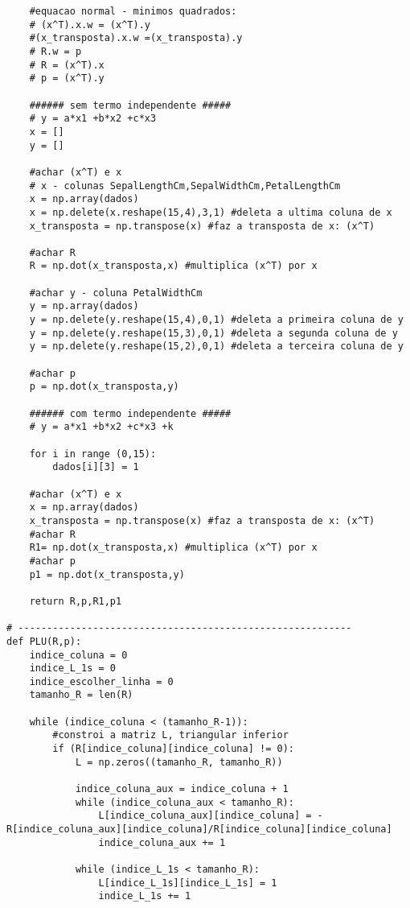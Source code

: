 \documentclass[a4paper,12pt,twoside]{article}
\begin{document}
\begin{lstlisting}
    #equacao normal - minimos quadrados:
    # (x^T).x.w = (x^T).y
    #(x_transposta).x.w =(x_transposta).y
    # R.w = p
    # R = (x^T).x
    # p = (x^T).y
    
    ###### sem termo independente #####
    # y = a*x1 +b*x2 +c*x3
    x = []
    y = []
    
    #achar (x^T) e x
    # x - colunas SepalLengthCm,SepalWidthCm,PetalLengthCm
    x = np.array(dados) 
    x = np.delete(x.reshape(15,4),3,1) #deleta a ultima coluna de x
    x_transposta = np.transpose(x) #faz a transposta de x: (x^T)
       
    #achar R
    R = np.dot(x_transposta,x) #multiplica (x^T) por x
    
    #achar y - coluna PetalWidthCm
    y = np.array(dados) 
    y = np.delete(y.reshape(15,4),0,1) #deleta a primeira coluna de y
    y = np.delete(y.reshape(15,3),0,1) #deleta a segunda coluna de y
    y = np.delete(y.reshape(15,2),0,1) #deleta a terceira coluna de y
    
    #achar p 
    p = np.dot(x_transposta,y) 
  
    ###### com termo independente #####
    # y = a*x1 +b*x2 +c*x3 +k
     
    for i in range (0,15):
        dados[i][3] = 1
        
    #achar (x^T) e x
    x = np.array(dados) 
    x_transposta = np.transpose(x) #faz a transposta de x: (x^T)
    #achar R
    R1= np.dot(x_transposta,x) #multiplica (x^T) por x
    #achar p 
    p1 = np.dot(x_transposta,y) 
      
    return R,p,R1,p1

# ----------------------------------------------------------
def PLU(R,p):
    indice_coluna = 0 
    indice_L_1s = 0
    indice_escolher_linha = 0
    tamanho_R = len(R)
    
    while (indice_coluna < (tamanho_R-1)):
        #constroi a matriz L, triangular inferior
        if (R[indice_coluna][indice_coluna] != 0):
            L = np.zeros((tamanho_R, tamanho_R))
            
            indice_coluna_aux = indice_coluna + 1
            while (indice_coluna_aux < tamanho_R):
                L[indice_coluna_aux][indice_coluna] = - R[indice_coluna_aux][indice_coluna]/R[indice_coluna][indice_coluna]
                indice_coluna_aux += 1
            
            while (indice_L_1s < tamanho_R):
                L[indice_L_1s][indice_L_1s] = 1
                indice_L_1s += 1
            

\end{lstlisting}
\end{document}
